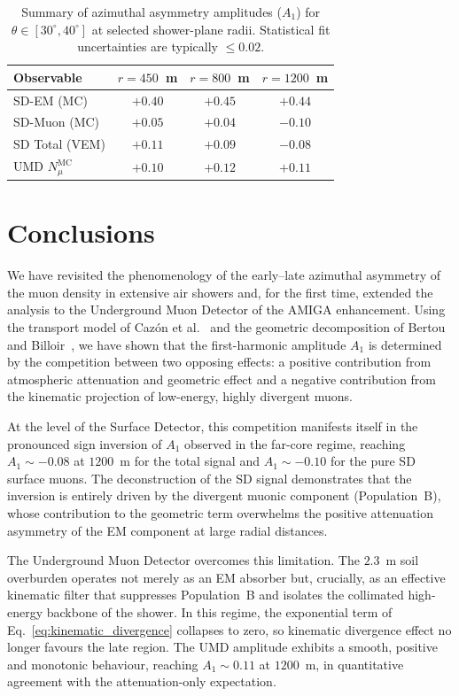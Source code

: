 \documentclass[11pt,a4paper]{article}
\begin{document}
\begin{table}[h]
\centering
\caption{Summary of azimuthal asymmetry amplitudes ($A_1$) for $\theta \in [30^\circ, 40^\circ]$ at selected shower-plane radii. Statistical fit uncertainties are typically $\le 0.02$.}
\label{tab:a1_summary}
\begin{tabular}{l c c c}
\toprule
\textbf{Observable} & \textbf{$r = 450$~m} & \textbf{$r = 800$~m} & \textbf{$r = 1200$~m} \\
\midrule
SD-EM (MC) & $+0.40$ & $+0.45$ & $+0.44$ \\
SD-Muon (MC) & $+0.05$ & $+0.04$ & $-0.10$ \\
SD Total (VEM) & $+0.11$ & $+0.09$ & $-0.08$ \\
UMD $N_\mu^{\mathrm{MC}}$ & $+0.10$ & $+0.12$ & $+0.11$ \\
\bottomrule
\end{tabular}
\end{table}

\newpage

\section{Conclusions}
\label{sec:conclusions}

We have revisited the phenomenology of the early--late azimuthal asymmetry of the muon density in extensive air showers and, for the first time, extended the analysis to the Underground Muon Detector of the AMIGA enhancement. Using the transport model of Caz\'on et al.~\cite{Cazon2012} and the geometric decomposition of Bertou and Billoir~\cite{GAP2000_017}, we have shown that the first-harmonic amplitude $A_1$ is determined by the competition between two opposing effects: a positive contribution from atmospheric attenuation and geometric effect and a negative contribution from the kinematic projection of low-energy, highly divergent muons.

At the level of the Surface Detector, this competition manifests itself in the pronounced sign inversion of $A_1$ observed in the far-core regime, reaching $A_1 \sim -0.08$ at $1200$~m for the total signal and $A_1 \sim -0.10$ for the pure SD surface muons. The deconstruction of the SD signal demonstrates that the inversion is entirely driven by the divergent muonic component (Population~B), whose contribution to the geometric term overwhelms the positive attenuation asymmetry of the EM component at large radial distances.

The Underground Muon Detector overcomes this limitation. The $2.3$~m soil overburden operates not merely as an EM absorber but, crucially, as an effective kinematic filter that suppresses Population~B and isolates the collimated high-energy backbone of the shower. In this regime, the exponential term of Eq.~\eqref{eq:kinematic_divergence} collapses to zero, so kinematic divergence effect no longer favours the late region. The UMD amplitude exhibits a smooth, positive and monotonic behaviour, reaching $A_1 \sim 0.11$ at $1200$~m, in quantitative agreement with the attenuation-only expectation.
\end{document}

